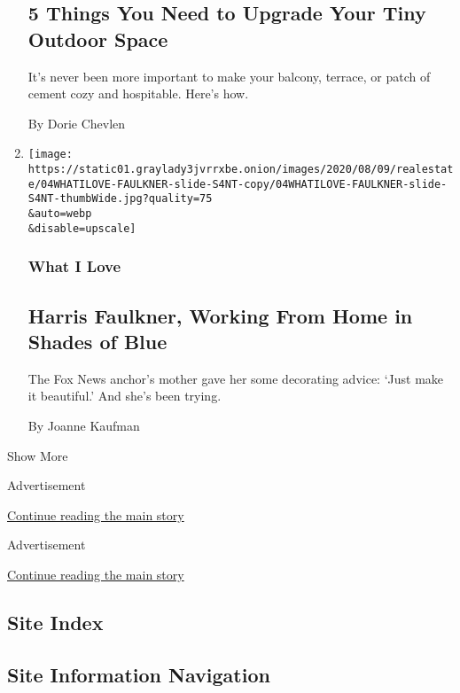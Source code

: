 \begin{enumerate}
  \hypertarget{5-things-you-need-to-upgrade-your-tiny-outdoor-space}{%
  \subsection{5 Things You Need to Upgrade Your Tiny Outdoor
  Space}\label{5-things-you-need-to-upgrade-your-tiny-outdoor-space}}

  It's never been more important to make your balcony, terrace, or patch
  of cement cozy and hospitable. Here's how.

  By Dorie Chevlen
\item
  \href{/2020/08/04/realestate/harris-faulkner-home-fox-news.html}{}

  \texttt{[image: https://static01.graylady3jvrrxbe.onion/images/2020/08/09/realestate/04WHATILOVE-FAULKNER-slide-S4NT-copy/04WHATILOVE-FAULKNER-slide-S4NT-thumbWide.jpg?quality=75\\\&auto=webp\\\&disable=upscale]}

  \hypertarget{what-i-love}{%
  \subsubsection{What I Love}\label{what-i-love}}

  \hypertarget{harris-faulkner-working-from-home-in-shades-of-blue}{%
  \subsection{Harris Faulkner, Working From Home in Shades of
  Blue}\label{harris-faulkner-working-from-home-in-shades-of-blue}}

  The Fox News anchor's mother gave her some decorating advice: `Just
  make it beautiful.' And she's been trying.

  By Joanne Kaufman
\end{enumerate}

Show More

Advertisement

\protect\hyperlink{after-mid3}{Continue reading the main story}

Advertisement

\protect\hyperlink{after-mktg}{Continue reading the main story}

\hypertarget{site-index}{%
\subsection{Site Index}\label{site-index}}

\hypertarget{site-information-navigation}{%
\subsection{Site Information
Navigation}\label{site-information-navigation}}

